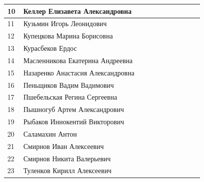 \documentclass[a4paper,landscape,11pt]{article}
\newcommand*\ok{&{\small \ding{51}}} %
\newcommand*\no{&{\small }} %
\begin{document}
\begin{tabular}{p{7pt}|l|p{\CS}|p{\CS}|p{\CS}|p{\CS}|p{\CS}|p{\CS}|p{\CS}|p{\CS}|p{\CS}}
10\,&  Келлер Елизавета Александровна     \ok\ok&&&&&&\\
\midrule
11\,&  Кузьмин Игорь Леонидович           \ok\no&&&&&&\\ 
12\,&  Купецкова Марина Борисовна         \ok\no&&&&&&\\
13\,&  Курасбеков Ердос                   \ok\no&&&&&&\\
14\,&  Масленникова Екатерина Андреевна   \ok\ok&&&&&&\\
15\,&  Назаренко Анастасия Александровна  \ok\no&&&&&&\\
\midrule
16\,&  Пеньщиков Вадим Вадимович          \no\no&&&&&&\\
17\,&  Пшебельская Регина Сергеевна       \ok\no&&&&&&\\ 
18\,&  Пышногуб Артем Александрович       \ok\no&&&&&&\\
19\,&  Рыбаков Иннокентий Викторович      \no\no&&&&&&\\
20\,&  Саламахин Антон                    \ok\no&&&&&&\\
\midrule
21\,&  Смирнов Иван Алексеевич            \no\no&&&&&&\\
22\,&  Смирнов Никита Валерьевич          \no\no&&&&&&\\
23\,&  Туленков Кирилл Алексеевич         \ok\no&&&&&&\\
\bottomrule
\end{tabular} 
\end{document}
